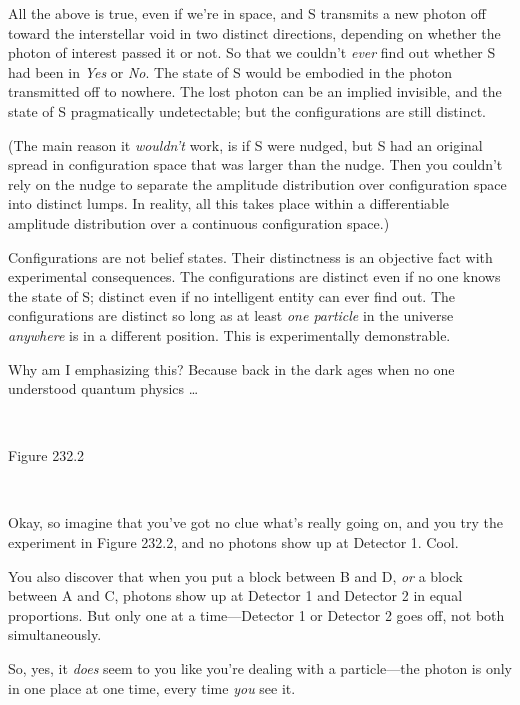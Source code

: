 {
 All the above is true, even if we're in space, and
S transmits a new photon off toward the interstellar void in two
distinct directions, depending on whether the photon of interest passed
it or not. So that we couldn't \textit{ever} find out
whether S had been in \textit{Yes} or \textit{No}. The state of S would
be embodied in the photon transmitted off to nowhere. The lost photon
can be an implied invisible, and the state of S pragmatically
undetectable; but the configurations are still distinct.}

{
 (The main reason it \textit{wouldn't} work, is if
S were nudged, but S had an original spread in configuration space that
was larger than the nudge. Then you couldn't rely on
the nudge to separate the amplitude distribution over configuration
space into distinct lumps. In reality, all this takes place within a
differentiable amplitude distribution over a continuous configuration
space.)}

{
 Configurations are not belief states. Their distinctness is an
objective fact with experimental consequences. The configurations are
distinct even if no one knows the state of S; distinct even if no
intelligent entity can ever find out. The configurations are distinct
so long as at least \textit{one particle} in the universe
\textit{anywhere} is in a different position. This is experimentally
demonstrable.}

{
 Why am I emphasizing this? Because back in the dark ages when no
one understood quantum physics \ldots}

{
 ~}

{\centering
{}
 \newline
 Figure 232.2
\par}


\bigskip

{
 ~}

{
 Okay, so imagine that you've got no clue
what's really going on, and you try the experiment in
Figure 232.2, and no photons show up at Detector 1. Cool.}

{
 You also discover that when you put a block between B and D,
\textit{or} a block between A and C, photons show up at Detector 1 and
Detector 2 in equal proportions. But only one at a time---Detector 1 or
Detector 2 goes off, not both simultaneously.}

{
 So, yes, it \textit{does} seem to you like you're
dealing with a particle---the photon is only in one place at one time,
every time \textit{you} see it.}

